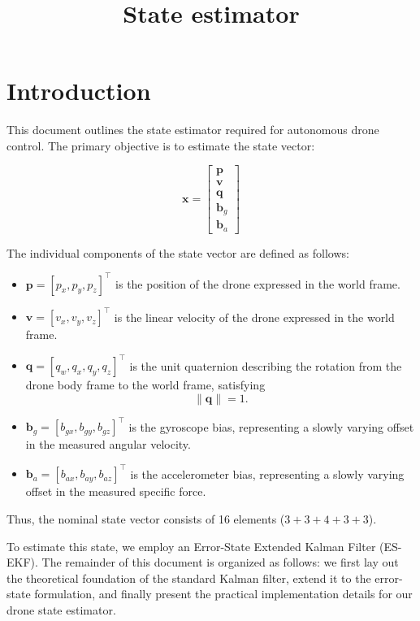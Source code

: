 \documentclass{article}
\title{State estimator}
\author{}
\date{}
\begin{document}
	
	\maketitle
	\section{Introduction}
	This document outlines the state estimator required for autonomous drone control. The primary objective is to estimate the state vector:
	
	\[
	\mathbf{x} =
	\begin{bmatrix}
		\mathbf{p} \\
		\mathbf{v} \\
		\mathbf{q} \\
		\mathbf{b}_g \\
		\mathbf{b}_a
	\end{bmatrix}
	\]
	
	The individual components of the state vector are defined as follows:
	
	\begin{itemize}
		\item $\mathbf{p} = [p_x, p_y, p_z]^\top$ is the position of the drone expressed in the world frame.
		
		\item $\mathbf{v} = [v_x, v_y, v_z]^\top$ is the linear velocity of the drone expressed in the world frame.
		
		\item $\mathbf{q} = [q_w, q_x, q_y, q_z]^\top$ is the unit quaternion describing the rotation from the drone body frame to the world frame, satisfying
		\[
		\|\mathbf{q}\| = 1.
		\]
		
		\item $\mathbf{b}_g = [b_{gx}, b_{gy}, b_{gz}]^\top$ is the gyroscope bias, representing a slowly varying offset in the measured angular velocity.
		
		\item $\mathbf{b}_a = [b_{ax}, b_{ay}, b_{az}]^\top$ is the accelerometer bias, representing a slowly varying offset in the measured specific force.
	\end{itemize}
	
	Thus, the nominal state vector consists of 16 elements ($3 + 3 + 4 + 3 + 3$).
	
	To estimate this state, we employ an Error-State Extended Kalman Filter (ES-EKF). The remainder of this document is organized as follows: we first lay out the theoretical foundation of the standard Kalman filter, extend it to the error-state formulation, and finally present the practical implementation details for our drone state estimator.
	
\end{document}

